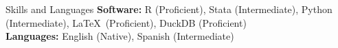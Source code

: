 \documentclass{resume} %
\begin{document}
\begin{rSection}{Skills and Languages}
{\bf Software:}  R (Proficient), Stata (Intermediate), Python (Intermediate), \LaTeX\ (Proficient), DuckDB (Proficient)\\
{\bf Languages:} English (Native), Spanish (Intermediate)

\end{rSection}





\end{document}

